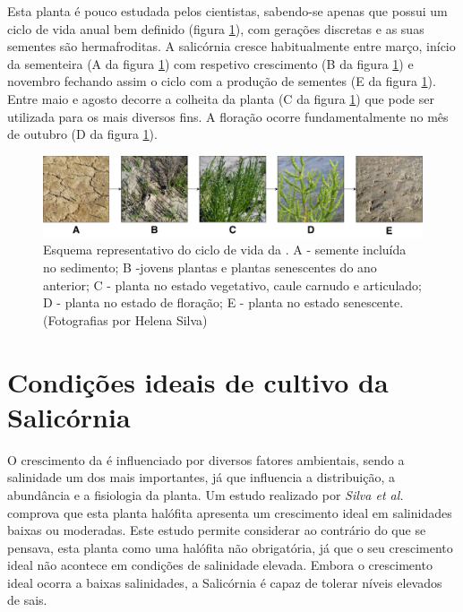 Esta planta é pouco estudada pelos cientistas\cite{Figueroa1987}, sabendo-se apenas que possui um ciclo de vida anual bem definido (figura \ref{ciclodevida}), com gerações discretas e as suas sementes são hermafroditas\cite{Silva2007}. A salicórnia cresce habitualmente entre março, início da sementeira (A da figura \ref{ciclodevida}) com respetivo crescimento (B da figura \ref{ciclodevida}) e novembro fechando assim o ciclo com a produção de sementes (E da figura \ref{ciclodevida}). Entre maio  e agosto decorre a colheita da planta\cite{RaquelPinto} (C da figura \ref{ciclodevida}) que pode ser utilizada para os mais diversos fins. A floração ocorre fundamentalmente no mês de outubro\cite{Figueroa1987} (D da figura \ref{ciclodevida}). 



	
\begin{figure}[!htb]
	\centering
	\includegraphics[width=\linewidth]{img/cap2-sali/ciclo/ciclodevida.pdf}
	\caption[Esquema representativo do ciclo de vida da \sr.]{Esquema representativo do ciclo de vida da \sr. A - semente incluída no sedimento; B -jovens plantas e plantas senescentes do ano anterior; C - planta no estado vegetativo, caule carnudo e articulado; D - planta no estado de floração; E - planta no estado senescente. (Fotografias por Helena Silva)}
	\label{ciclodevida}
\end{figure}



\section{Condições ideais de cultivo da Salicórnia}

O crescimento da \sr \space é influenciado por diversos fatores ambientais, sendo a salinidade um dos mais importantes, já que influencia a distribuição, a abundância e a fisiologia da planta. Um estudo realizado por \textit{Silva et al.}\cite{Silva2007} comprova que esta planta halófita apresenta um crescimento ideal em salinidades baixas ou moderadas. Este estudo permite considerar ao contrário do que se pensava, esta planta como uma halófita não obrigatória, já que o seu crescimento ideal não acontece em condições de salinidade elevada. Embora o crescimento ideal ocorra a baixas salinidades, a Salicórnia é capaz de tolerar níveis elevados de sais\cite{Rubio-Casal2003}.

